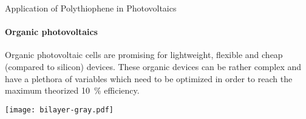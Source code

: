 \begin{section}{Application of Polythiophene in Photovoltaics}\label{intro-pv}

\paragraph{Organic photovoltaics} Organic photovoltaic cells are promising for lightweight, flexible and cheap (compared to silicon) devices. These organic devices can be rather complex and have a plethora of variables which need to be optimized in order to reach the maximum theorized 10~\% efficiency.

\begin{SCfigure}[][tbp]%
\centering
\texttt{[image: bilayer-gray.pdf]}
\caption[Structure of a bilayer solar cell.]{Structure of a bilayer solar cell. Only excitons generated near an interface can break in free charges.}
\label{fig:bilayer}
\end{SCfigure}


\end{section}
